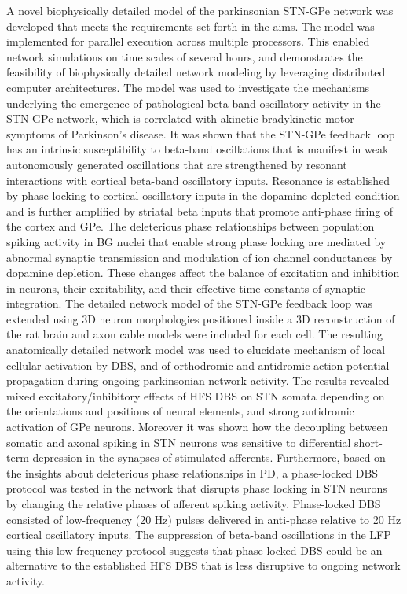 %
A novel biophysically detailed model of the parkinsonian STN-GPe network was developed
that meets the requirements set forth in the aims. The model was implemented for
parallel execution across multiple processors. This enabled network simulations
on time scales of several hours, and demonstrates the feasibility of biophysically
detailed network modeling by leveraging distributed computer architectures.
%
The model was used to investigate the mechanisms underlying the emergence of
pathological beta-band oscillatory activity in the STN-GPe network,
which is correlated with akinetic-bradykinetic motor symptoms of Parkinson's disease.
%
It was shown that the STN-GPe feedback loop has an intrinsic susceptibility
to beta-band oscillations that is manifest in weak autonomously generated oscillations
that are strengthened by resonant interactions with cortical beta-band oscillatory
inputs. Resonance is established by phase-locking to cortical oscillatory
inputs in the dopamine depleted condition and is further amplified by striatal beta
inputs that promote anti-phase firing of the cortex and GPe.
The deleterious phase relationships between population spiking activity
in BG nuclei that enable strong phase locking are mediated by abnormal
synaptic transmission and modulation of ion channel conductances by dopamine depletion.
These changes affect the balance of excitation and inhibition in neurons,
their excitability, and their effective time constants of synaptic integration.
%
%
%
The detailed network model of the STN-GPe feedback loop was extended
using 3D neuron morphologies positioned inside a 3D reconstruction of the rat brain
and axon cable models were included for each cell. The resulting anatomically detailed
network model was used to elucidate mechanism of local cellular activation
by DBS, and of orthodromic and antidromic action potential propagation
during ongoing parkinsonian network activity. The results revealed mixed
excitatory/inhibitory effects of HFS DBS on STN somata depending on the orientations
and positions of neural elements, and strong antidromic activation of GPe neurons.
Moreover it was shown how the decoupling between somatic and axonal spiking
in STN neurons was sensitive to differential short-term depression in the
synapses of stimulated afferents.
%
Furthermore, based on the insights about deleterious phase relationships in PD,
a phase-locked DBS protocol was tested in the network
that disrupts phase locking in STN neurons by changing the relative phases of
afferent spiking activity. Phase-locked DBS consisted of low-frequency (20 Hz)
pulses delivered in anti-phase relative to 20 Hz cortical oscillatory inputs.
The suppression of beta-band oscillations in the LFP using this low-frequency
protocol suggests that phase-locked DBS could be an alternative to the
established HFS DBS that is less disruptive to ongoing network activity.
%
%
%

